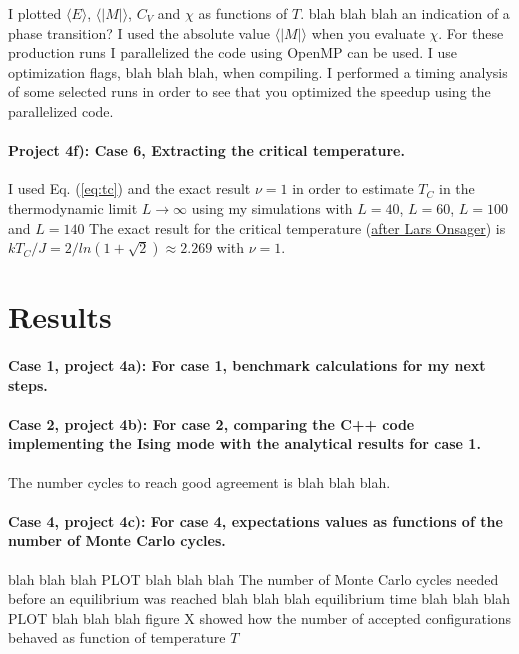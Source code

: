 \documentclass[10pt,showpacs,preprintnumbers,footinbib,amsmath,amssymb,aps,prl,twocolumn,groupedaddress,superscriptaddress,showkeys]{revtex4-1}
\begin{document}
I plotted $\langle E\rangle$,
$\langle \vert M\vert\rangle$, $C_V$ and $\chi$ as functions of $T$.  blah blah blah an indication of a phase transition?  I used the absolute value
$\langle \vert M\vert\rangle$ when you evaluate $\chi$.  For these production runs I
parallelized the code using OpenMP can be used. I use optimization flags, blah blah blah, when compiling. I performed a timing analysis of some selected runs in order to see that you optimized the speedup using the parallelized code. 



\paragraph{Project 4f): Case 6, Extracting the critical temperature.}
I used Eq. (\ref{eq:tc}) and the exact result
$\nu=1$ in order to estimate $T_C$ in the thermodynamic limit 
$L\rightarrow \infty$
using my simulations with $L=40$, $L=60$, $L=100$ and $L=140$
The exact result for the critical temperature (\href{{http://journals.aps.org/pr/abstract/10.1103/PhysRev.65.117}}{after Lars Onsager}) is
$kT_C/J=2/ln(1+\sqrt{2})\approx 2.269$ with $\nu=1$.


 \section{Results}
 \paragraph{Case 1, project 4a): For case 1, benchmark calculations for my next steps.}
 
 \paragraph{Case 2, project 4b):  For case 2, comparing the C++ code implementing the Ising mode with the analytical results for case 1.}
The number cycles to reach good agreement is blah blah blah.

\paragraph{Case 4, project 4c): For case 4,  expectations values as functions of the number of Monte Carlo cycles.}
blah blah blah
PLOT
blah blah blah
The number of Monte Carlo cycles needed before an equilibrium was reached blah blah blah equilibrium time
blah blah blah
PLOT
blah blah blah
figure X showed how the number of accepted configurations behaved as function of temperature $T$
\end{document}
